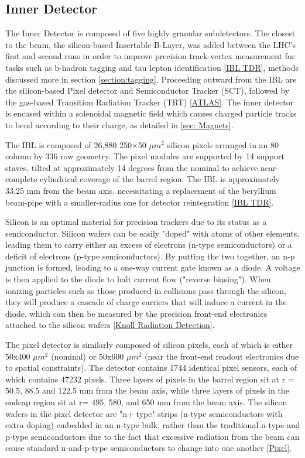 \subsection{Inner Detector} \label{sec:ID} 

The Inner Detector is composed of five highly granular subdetectors. The closest to the beam, the silicon-based Insertable B-Layer, was added between the LHC's first and second runs in order to improve precision track-vertex measurement for tasks such as b-hadron tagging and tau lepton identification \ref{IBL TDR}, methods discussed more in section \ref{section:tagging}. Proceeding outward from the IBL are the silicon-based Pixel detector and Semiconductor Tracker (SCT), followed by the gas-based Transition Radiation Tracker (TRT) \ref{ATLAS}. The inner detector is encased within a solenoidal magnetic field which causes charged particle tracks to bend according to their charge, as detailed in \ref{sec: Magnets}.

The IBL is composed of 26,880 250×50 $ \mu m^2 $ silicon pixels arranged in an 80 column by 336 row geometry. The pixel modules are supported by 14 support staves, tilted at approximately 14 degrees from the nominal to achieve near-complete cylindrical coverage of the barrel region. The IBL is approximately 33.25 mm from the beam axis, necessitating a replacement of the beryllium beam-pipe with a smaller-radius one for detector reintegration \ref{IBL TDR}.

Silicon is an optimal material for precision trackers due to its status as a semiconductor. Silicon wafers can be easily "doped" with atoms of other elements, leading them to carry either an excess of electrons (n-type semiconductors) or a deficit of electrons (p-type semiconductors). By putting the two together, an n-p junction is formed, leading to a one-way current gate known as a diode. A voltage is then applied to the diode to halt current flow ("reverse biasing"). When ionizing particles such as those produced in collisions pass through the silicon, they will produce a cascade of charge carriers that will induce a current in the diode, which can then be measured by the precision front-end electronics attached to the silicon wafers \ref{Knoll Radiation Detection}.

The pixel detector is similarly composed of silicon pixels, each of which is either 50x400 $ \mu m^2 $ (nominal) or 50x600 $ \mu m^2 $ (near the front-end readout electronics due to spatial constraints). The detector contains 1744 identical pixel sensors, each of which contains 47232 pixels. Three layers of pixels in the barrel region sit at r = 50.5,  88.5 and 122.5 mm from the beam axis, while three layers of pixels in the endcap region sit at r= 495, 580, and 650 mm from the beam axis. The silicon wafers in the pixel detector are "n+ type" strips (n-type semiconductors with extra doping) embedded in an n-type bulk, rather than the traditional n-type and p-type semiconductors due to the fact that excessive radiation from the beam can cause standard n-and-p-type semiconductors to change into one another \ref{Pixel}. 


